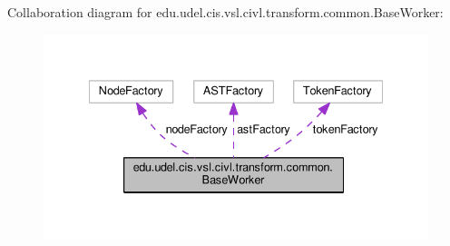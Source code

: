 Collaboration diagram for edu.\+udel.\+cis.\+vsl.\+civl.\+transform.\+common.\+Base\+Worker\+:
\nopagebreak
\begin{figure}[H]
\begin{center}
\leavevmode
\includegraphics[width=335pt]{classedu_1_1udel_1_1cis_1_1vsl_1_1civl_1_1transform_1_1common_1_1BaseWorker__coll__graph}
\end{center}
\end{figure}
